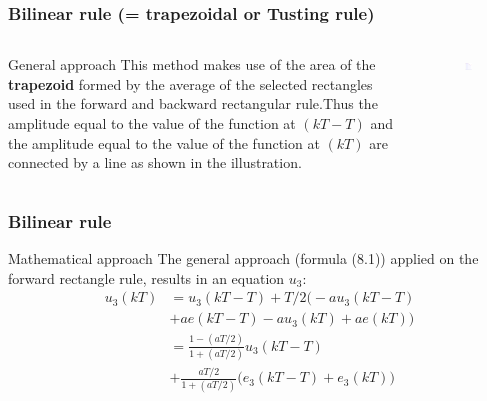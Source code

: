\begin{frame}
	\frametitle{Bilinear rule (= trapezoidal or Tusting rule)}
	\begin{columns}
		\begin{column}{0.5\textwidth}
			\begin{block}{General approach}
				This method makes use of the area of the \textbf{trapezoid} formed by the average of the selected rectangles used in the forward and backward rectangular rule.Thus the amplitude equal to the value of the function at $(kT - T)$ and the amplitude equal to the value of the function at $(kT)$ are connected by a line as shown in the illustration.
			\end{block}	
		\end{column}
		
		\begin{column}{0.5\textwidth}
			\begin{figure}
				\centering
				\includegraphics[width=1\linewidth]{Trapezium}
			\end{figure}
		\end{column}	
	\end{columns}
\end{frame}

\begin{frame}
	\frametitle{Bilinear rule}
	\begin{block}{Mathematical approach}
		The general approach (formula (8.1)) applied on the forward rectangle rule, results in an equation $u_3$:
		\begin{align*}
		u_3(kT)& =u_3(kT - T) + T/2\big(-au_3(kT - T)\\
		& + ae(kT - T) - au_3(kT) + ae(kT)\big)\\
		& =\frac{1-(aT/2)}{1 + (aT/2)}u_3(kT - T)\\
		& +\frac{aT/2}{1 + (aT/2)} \big(e_3(kT - T) + e_3(kT)\big)
		\end{align*}
	\end{block}
\end{frame}

